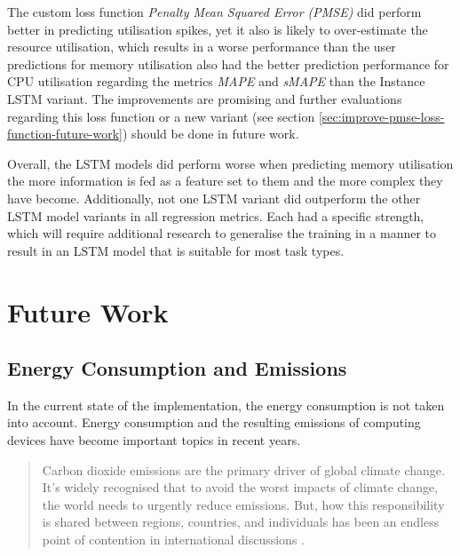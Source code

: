         The custom loss function \emph{Penalty Mean Squared Error (PMSE)} did perform better in predicting utilisation spikes, yet it also is likely to over-estimate the resource utilisation, which results in a worse performance than the user predictions for memory utilisation also had the better prediction performance for CPU utilisation regarding the metrics \emph{MAPE} and \emph{sMAPE} than the Instance LSTM variant.
        The improvements are promising and further evaluations regarding this loss function or a new variant (see section \ref{sec:improve-pmse-loss-function-future-work}) should be done in future work.

        Overall, the LSTM models did perform worse when predicting memory utilisation the more information is fed as a feature set to them and the more complex they have become.
        Additionally, not one LSTM variant did outperform the other LSTM model variants in all regression metrics.
        Each had a specific strength, which will require additional research to generalise the training in a manner to result in an LSTM model that is suitable for most task types. 



    \section{Future Work}
    \label{sec:future-work}


        \subsection{Energy Consumption and \COTWO Emissions}
        \label{sec:energy-consumption-future-work}

            In the current state of the implementation, the energy consumption is not taken into account.
            Energy consumption and the resulting \COTWO emissions of computing devices have become important topics in recent years.

            \begin{quote}
                Carbon dioxide emissions are the primary driver of global climate change. It's widely recognised that to avoid the worst impacts of climate change, the world needs to urgently reduce emissions. But, how this responsibility is shared between regions, countries, and individuals has been an endless point of contention in international discussions \cite{ritchieCOGreenhouseGas2020}. 
            \end{quote}

